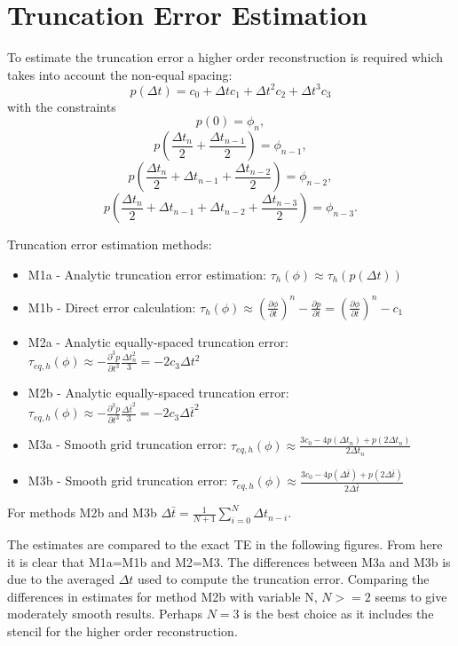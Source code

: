 \documentclass[10pt]{article}%
\begin{document}
\break

\section*{Truncation Error Estimation}
To estimate the truncation error a higher order reconstruction is required which takes into account the non-equal spacing:
\[ p(\Delta t) = c_0 + \Delta t c_1 + \Delta t^2 c_2 + \Delta t^3 c_3 \]
with the constraints 
\[p(0)=\phi_n,\]
\[p\left(\frac{\Delta t_n}{2} + \frac{\Delta t_{n-1}}{2}\right)=\phi_{n-1},\]
\[p\left(\frac{\Delta t_n}{2} + \Delta t_{n-1} + \frac{\Delta t_{n-2}}{2}\right)=\phi_{n-2},\]
\[p\left(\frac{\Delta t_n}{2} + \Delta t_{n-1} + \Delta t_{n-2} + \frac{\Delta t_{n-3}}{2}\right)=\phi_{n-3}.\]

Truncation error estimation methods:
\begin{itemize}
  \item M1a - Analytic truncation error estimation: $\tau_h(\phi) \approx \tau_h(p(\Delta t))$ 
  \item M1b - Direct error calculation: $\tau_h(\phi) \approx \left(\frac{\partial \phi}{\partial t}\right)^n - \frac{\partial p}{\partial t} = \left(\frac{\partial \phi}{\partial t}\right)^n - c_1$
  \item M2a  - Analytic equally-spaced truncation error: $\tau_{eq,h}(\phi) \approx -\frac{\partial^3 p}{\partial t^3} \frac{\Delta t_n^2}{3} = -2 c_3 \Delta t^2$
  \item M2b  - Analytic equally-spaced truncation error: $\tau_{eq,h}(\phi) \approx -\frac{\partial^3 p}{\partial t^3} \frac{\Delta \bar t^2}{3} = -2 c_3 \Delta \bar t^2$
  \item M3a - Smooth grid truncation error: $\tau_{eq,h}(\phi) \approx \frac{3c_0 - 4p(\Delta t_n) + p(2\Delta t_n)}{2\Delta t_n}$
  \item M3b - Smooth grid truncation error: $\tau_{eq,h}(\phi) \approx \frac{3c_0 - 4p(\Delta \bar t) + p(2\Delta \bar t)}{2\Delta \bar t}$

\end{itemize}
For methods M2b and M3b $\Delta \bar t = \frac{1}{N+1}\sum_{i=0}^N \Delta t_{n-i}$.

The estimates are compared to the exact TE in the following figures. From here it is clear that M1a=M1b and M2=M3. The differences between M3a and M3b is due to the averaged $\Delta t$ used to compute the truncation error. Comparing the differences in estimates for method M2b with variable N, $N>=2$ seems to give moderately smooth results. Perhaps $N=3$ is the best choice as it includes the stencil for the higher order reconstruction.
\end{document}
